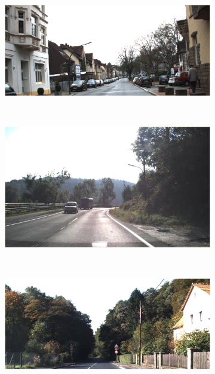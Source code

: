 \documentclass[11pt, french]{article}
\begin{document}
\begin{figure}[h]
    \centering
    \begin{subfigure}[b]{0.4\textwidth}
        \includegraphics[width=\textwidth]{0.png}
        \caption{}
        \label{fig:0}
    \end{subfigure}
    ~ %
    \begin{subfigure}[b]{0.4\textwidth}
        \includegraphics[width=\textwidth]{1.png}
        \caption{}
        \label{fig:1}
    \end{subfigure}
    \newline
    ~ %
    \begin{subfigure}[b]{0.4\textwidth}
        \includegraphics[width=\textwidth]{11.png}

\end{subfigure}
\end{figure}
\end{document}
